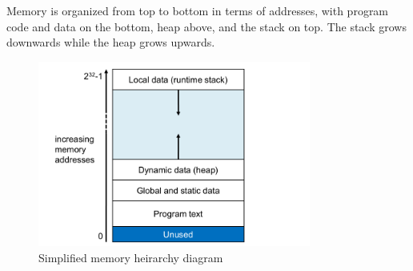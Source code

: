 \documentclass[11pt]{article}
\begin{document}
		Memory is organized from top to bottom in terms of addresses, with program code and data on the bottom, heap above, and the stack on top. The stack grows downwards while the heap grows upwards.
		
	\begin{figure}[htb]
		\centering
		\includegraphics[width=0.8\textwidth]{vmem.png}
		\caption{Simplified memory heirarchy diagram}
		\label{fig:virtual memory}
	\end{figure}

%		
%		


\end{document}

